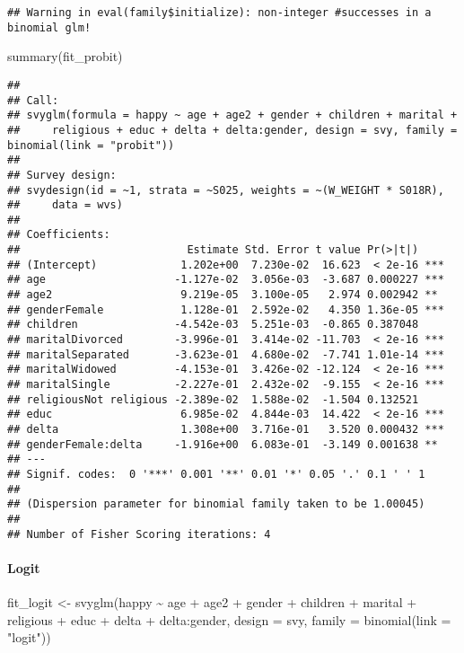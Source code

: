 \documentclass[
]{article}
\newenvironment{Shaded}{\begin{snugshade}}{\end{snugshade}}
\newcommand{\AttributeTok}[1]{\textcolor[rgb]{0.77,0.63,0.00}{#1}}
\newcommand{\FunctionTok}[1]{\textcolor[rgb]{0.00,0.00,0.00}{#1}}
\newcommand{\NormalTok}[1]{#1}
\newcommand{\OtherTok}[1]{\textcolor[rgb]{0.56,0.35,0.01}{#1}}
\newcommand{\SpecialCharTok}[1]{\textcolor[rgb]{0.00,0.00,0.00}{#1}}
\newcommand{\StringTok}[1]{\textcolor[rgb]{0.31,0.60,0.02}{#1}}
\begin{document}
\begin{verbatim}
## Warning in eval(family$initialize): non-integer #successes in a binomial glm!
\end{verbatim}

\begin{Shaded}
\begin{Highlighting}[]
\FunctionTok{summary}\NormalTok{(fit\_probit)}
\end{Highlighting}
\end{Shaded}

\begin{verbatim}
## 
## Call:
## svyglm(formula = happy ~ age + age2 + gender + children + marital + 
##     religious + educ + delta + delta:gender, design = svy, family = binomial(link = "probit"))
## 
## Survey design:
## svydesign(id = ~1, strata = ~S025, weights = ~(W_WEIGHT * S018R), 
##     data = wvs)
## 
## Coefficients:
##                          Estimate Std. Error t value Pr(>|t|)    
## (Intercept)             1.202e+00  7.230e-02  16.623  < 2e-16 ***
## age                    -1.127e-02  3.056e-03  -3.687 0.000227 ***
## age2                    9.219e-05  3.100e-05   2.974 0.002942 ** 
## genderFemale            1.128e-01  2.592e-02   4.350 1.36e-05 ***
## children               -4.542e-03  5.251e-03  -0.865 0.387048    
## maritalDivorced        -3.996e-01  3.414e-02 -11.703  < 2e-16 ***
## maritalSeparated       -3.623e-01  4.680e-02  -7.741 1.01e-14 ***
## maritalWidowed         -4.153e-01  3.426e-02 -12.124  < 2e-16 ***
## maritalSingle          -2.227e-01  2.432e-02  -9.155  < 2e-16 ***
## religiousNot religious -2.389e-02  1.588e-02  -1.504 0.132521    
## educ                    6.985e-02  4.844e-03  14.422  < 2e-16 ***
## delta                   1.308e+00  3.716e-01   3.520 0.000432 ***
## genderFemale:delta     -1.916e+00  6.083e-01  -3.149 0.001638 ** 
## ---
## Signif. codes:  0 '***' 0.001 '**' 0.01 '*' 0.05 '.' 0.1 ' ' 1
## 
## (Dispersion parameter for binomial family taken to be 1.00045)
## 
## Number of Fisher Scoring iterations: 4
\end{verbatim}

\hypertarget{logit}{%
\paragraph{Logit}\label{logit}}

\begin{Shaded}
\begin{Highlighting}[]
\NormalTok{fit\_logit }\OtherTok{\textless{}{-}} \FunctionTok{svyglm}\NormalTok{(happy }\SpecialCharTok{\textasciitilde{}}\NormalTok{ age }\SpecialCharTok{+}\NormalTok{ age2 }\SpecialCharTok{+}\NormalTok{ gender }\SpecialCharTok{+}\NormalTok{ children }\SpecialCharTok{+}\NormalTok{ marital }\SpecialCharTok{+}\NormalTok{ religious }\SpecialCharTok{+}\NormalTok{ educ }\SpecialCharTok{+}
\NormalTok{                      delta }\SpecialCharTok{+}\NormalTok{ delta}\SpecialCharTok{:}\NormalTok{gender,}
                    \AttributeTok{design =}\NormalTok{ svy,}
                    \AttributeTok{family =} \FunctionTok{binomial}\NormalTok{(}\AttributeTok{link =} \StringTok{"logit"}\NormalTok{))}
\end{Highlighting}
\end{Shaded}
\end{document}
